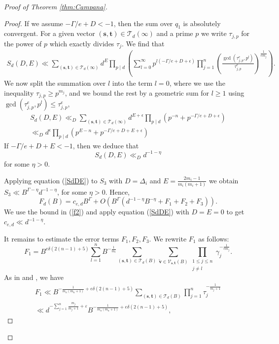 \documentclass[10pt, a4paper, reqno, english]{amsart}
\theoremstyle{definition}
\numberwithin{theorem}{section}
\numberwithin{equation}{section}
\begin{document}
\begin{proof}[Proof of Theorem \ref{thm:Campana}]
\begin{proof}
If we assume $-\Gamma/e+D<-1$, then the sum over $q_1$ is absolutely convergent. For a given vector $(\mathbf{s},\mathbf{t})\in \mathcal T_d(\infty)$ and a prime $p$ we write $\tau_{j,p}$ for the power of $p$ which exactly divides $\tau_j$. We find that
\begin{gather*}
S_d(D,E)\ll  \sum_{(\mathbf s,\mathbf t)\in \mathcal T_d(\infty)}   d^E \prod_{p\mid d}\left( \sum_{l=0}^\infty p^{l(-\Gamma/e+D+\epsilon)}  \prod_{j=1}^n\left(\frac{\gcd(\tau_{j,p}^e,p^l)}{\tau_{j,p}^e}\right)^{\frac 1{em_j}}  \right).
\end{gather*}
We now split the summation over $l$ into the term $l=0$, where we use the inequality $\tau_{j,p}\geq p^{m_j}$, and we bound the rest by a geometric sum for $l\geq 1$ using $\gcd(\tau_{j,p}^e,p^l)\leq\tau_{j,p}^e$,
\begin{gather*}
S_d(D,E) \ll_D  \sum_{(\mathbf s,\mathbf t)\in \mathcal T_d(\infty)}  d^{E+\epsilon}  \prod_{p\mid d}\left( p^{-n} + p^{-\Gamma/e+D+\epsilon}\right)\\
\ll_D  d^{\epsilon}  \prod_{p\mid d}\left( p^{E-n} + p^{-\Gamma/e+D+E+\epsilon}\right)
\end{gather*}
If $-\Gamma/e+D+E<-1$, then we deduce that
\begin{equation}\label{SdDE}
S_d(D,E)\ll_D d^{-1-\eta}
\end{equation} 
for some $\eta >0$.\par
Applying equation (\ref{SdDE}) to $S_3$ with $D=\Delta_i$ and $E=\frac{2m_i-1}{m_i(m_i+1)}$ we obtain $S_3\ll B^{\Gamma-\eta} d^{-1-\eta}$, for some $\eta>0$. 
Hence,
$$
F_{d}(B)=c_{e,d}B^\Gamma +O(B^\Gamma(d^{-1-\eta}B^{-\eta} +F_1+F_2+F_3)).
$$
We use the bound in (\ref{f2}) and apply equation (\ref{SdDE}) with $D=E=0$ to get $c_{e,d}\ll d^{-1-\eta}$.\par
It remains to estimate the error terms $F_1,F_2,F_3$. We rewrite $F_1$ as follows:
$$
F_1=B^{e\delta(2(n-1)+5)} 
\sum_{l=1}^nB^{-\frac 1{m_l}} \sum_{(\mathbf s,\mathbf t)\in \mathcal T_d(B)}\sum_{\tilde{\mathbf v}\in\mathcal V_{\mathbf s,\mathbf t}(B)}
\prod_{\substack{1\leq j\leq n\\j\neq l}}\gamma_j^{-\frac 1{em_j}}.
$$
 As in \cite[\S3]{BY} and \cite[\S6]{BBKOPWproc}, we have
\begin{gather*}
F_1\ll B^{-\frac 1{m_n(m_n+1)} + e\delta(2(n-1)+5)}\sum_{(\mathbf s,\mathbf t)\in \mathcal T_d(B)} \prod_{j=1}^n\tau_j^{-\frac 1{m_j+1}} \\
\ll d^{-\sum_{j=1}^n\frac{m_j}{m_j+1}+\varepsilon} B^{-\frac 1{m_n(m_n+1)} + e\delta(2(n-1)+5)},

\end{gather*}
\end{proof}
\end{proof}
\end{document}
